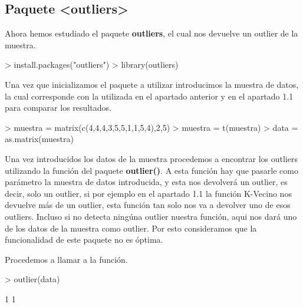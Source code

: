 \documentclass [a4paper] {article}
\begin{document}
\subsection{Paquete <outliers>}
\bigskip
Ahora hemos estudiado el paquete \textbf{outliers}, el cual nos devuelve un outlier de la muestra.
\begin{Schunk}
\begin{Sinput}
> install.packages("outliers")
> library(outliers)
\end{Sinput}
\end{Schunk}
\bigskip
Una vez que inicializamos el paquete a utilizar introducimos la muestra de datos, la cual corresponde
con la utilizada en el apartado anterior y en el apartado 1.1 para comparar los resultados.
\begin{Schunk}
\begin{Sinput}
> muestra = matrix(c(4,4,4,3,5,5,1,1,5,4),2,5)
> muestra = t(muestra)
> data = as.matrix(muestra)
\end{Sinput}
\end{Schunk}
\bigskip
Una vez introducidos los datos de la muestra procedemos a encontrar los outliers utilizando la función
del paquete \textbf{outlier()}. A esta función hay que pasarle como parámetro la muestra de datos introducida,
y esta nos devolverá un outlier, es decir, solo un outlier, si por ejemplo en el apartado 1.1 la función
K-Vecino nos devuelve más de un outlier, esta función tan solo nos va a devolver uno de esos outliers. Incluso
si no detecta ningúna outlier nuestra función, aqui nos dará uno de los datos de la muestra como outlier.
Por esto consideramos que la funcionalidad de este paquete no es óptima.

\bigskip
Procedemos a llamar a la función.
\begin{Schunk}
\begin{Sinput}
> outlier(data)
\end{Sinput}
\begin{Soutput}
[1] 1 1
\end{Soutput}
\end{Schunk}
\end{document}
